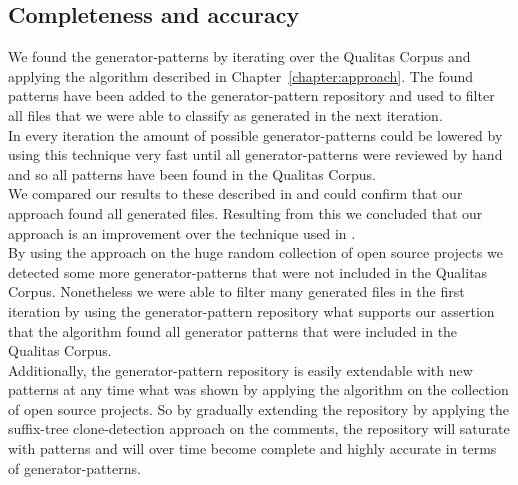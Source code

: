 \subsection{Completeness and accuracy}
We found the generator-patterns by iterating over the Qualitas Corpus and applying the algorithm described in Chapter~\ref{chapter:approach}. The found patterns have been added to the generator-pattern repository and used to filter all files that we were able to classify as generated in the next iteration.\\
In every iteration the amount of possible generator-patterns could be lowered by using this technique very fast until all generator-patterns were reviewed by hand and so all patterns have been found in the Qualitas Corpus.\\
We compared our results to these described in \cite{Bernwieser2014} and could confirm that our approach found all generated files. Resulting from this we concluded that our approach is an improvement over the technique used in \cite{Bernwieser2014}.\\
By using the approach on the huge random collection of open source projects we detected some more generator-patterns that were not included in the Qualitas Corpus. Nonetheless we were able to filter many generated files in the first iteration by using the generator-pattern repository what supports our assertion that the algorithm found all generator patterns that were included in the Qualitas Corpus.\\
Additionally, the generator-pattern repository is easily extendable with new patterns at any time what was shown by applying the algorithm on the collection of open source projects. So by gradually extending the repository by applying the suffix-tree clone-detection approach on the comments, the repository will saturate with patterns and will over time become complete and highly accurate in terms of generator-patterns.

